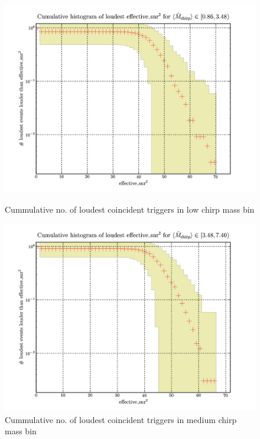 \documentclass[epsf]{article}
\begin{document}
\begin{figure}[ht]
\begin{minipage}[b]{0.5\linewidth}
\centering
\includegraphics[scale=0.15]{Triggers_Mc1.png}
\caption{Cummulative no. of loudest coincident triggers in low chirp mass bin}
\label{fig:9}
\end{minipage}
\hspace{0.5cm}
\begin{minipage}[b]{0.5\linewidth}
\centering
\includegraphics[scale=0.15]{Triggers_Mc2.png}
\caption{Cummulative no. of loudest coincident triggers in medium chirp mass bin}
\label{fig:10}
\end{minipage}
\end{figure}
\end{document}
